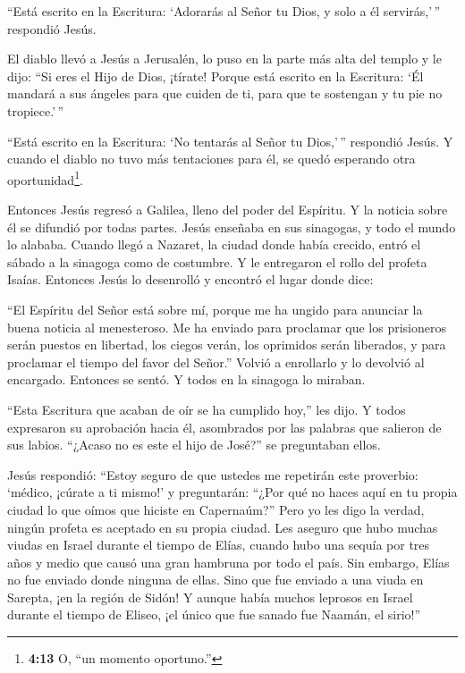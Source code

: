  ``Está escrito en la Escritura: `Adorarás al Señor tu Dios,
y solo a él servirás,'\,'' respondió Jesús.

 El diablo llevó a Jesús a Jerusalén, lo puso en la parte
más alta del templo y le dijo: ``Si eres el Hijo de Dios, ¡tírate!
 Porque está escrito en la Escritura: `Él mandará a sus
ángeles para que cuiden de ti,  para que te sostengan y tu
pie no tropiece.'\,''

 ``Está escrito en la Escritura: `No tentarás al Señor tu
Dios,'\,'' respondió Jesús.  Y cuando el diablo no tuvo más
tentaciones para él, se quedó esperando otra oportunidad\footnote{\textbf{4:13}
  O, ``un momento oportuno.''}.

 Entonces Jesús regresó a Galilea, lleno del poder del
Espíritu. Y la noticia sobre él se difundió por todas partes.
 Jesús enseñaba en sus sinagogas, y todo el mundo lo
alababa.  Cuando llegó a Nazaret, la ciudad donde había
crecido, entró el sábado a la sinagoga como de costumbre. 
Y le entregaron el rollo del profeta Isaías. Entonces Jesús lo
desenrolló y encontró el lugar donde dice:

 ``El Espíritu del Señor está sobre mí, porque me ha ungido
para anunciar la buena noticia al menesteroso. Me ha enviado para
proclamar que los prisioneros serán puestos en libertad, los ciegos
verán, los oprimidos serán liberados,  y para proclamar el
tiempo del favor del Señor.''  Volvió a enrollarlo y lo
devolvió al encargado. Entonces se sentó. Y todos en la sinagoga lo
miraban.

 ``Esta Escritura que acaban de oír se ha cumplido hoy,''
les dijo.  Y todos expresaron su aprobación hacia él,
asombrados por las palabras que salieron de sus labios. ``¿Acaso no es
este el hijo de José?'' se preguntaban ellos.

 Jesús respondió: ``Estoy seguro de que ustedes me
repetirán este proverbio: `médico, ¡cúrate a ti mismo!' y preguntarán:
``¿Por qué no haces aquí en tu propia ciudad lo que oímos que hiciste en
Capernaúm?''  Pero yo les digo la verdad, ningún profeta es
aceptado en su propia ciudad.  Les aseguro que hubo muchas
viudas en Israel durante el tiempo de Elías, cuando hubo una sequía por
tres años y medio que causó una gran hambruna por todo el país.
 Sin embargo, Elías no fue enviado donde ninguna de ellas.
Sino que fue enviado a una viuda en Sarepta, ¡en la región de Sidón!
 Y aunque había muchos leprosos en Israel durante el tiempo
de Eliseo, ¡el único que fue sanado fue Naamán, el sirio!''


